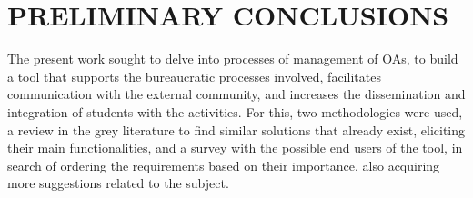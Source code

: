 \chapter{PRELIMINARY CONCLUSIONS}\label{conclusions}

The present work sought to delve into processes of management of \aclp{OA}, to build a tool that supports the bureaucratic processes involved, facilitates communication with the external community, and increases the dissemination and integration of students with the activities. 
For this, two methodologies were used, a review in the grey literature to find similar solutions that already exist, eliciting their main functionalities, and a survey with the possible end users of the tool, in search of ordering the requirements based on their importance, also acquiring more suggestions related to the subject.

